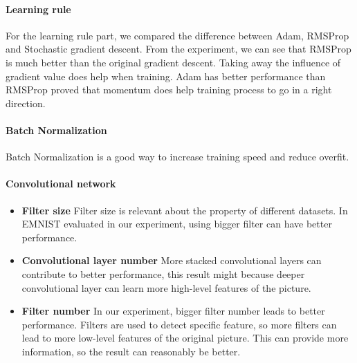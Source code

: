 \documentclass{article}
\begin{document}
\paragraph{Learning rule} For the learning rule part, we compared the difference between Adam, RMSProp and Stochastic gradient descent. From the experiment, we can see that RMSProp is much better than the original gradient descent. Taking away the influence of gradient value does help when training. Adam has better performance than RMSProp  proved that momentum does help training process to go in a right direction.

\paragraph{Batch Normalization} Batch Normalization is a good way to increase training speed and reduce overfit.

\paragraph{Convolutional network}
\begin{itemize}
	\item \textbf{Filter size} Filter size is relevant about the property of different datasets. In EMNIST evaluated in our experiment, using bigger filter can have better performance.
	\item \textbf{Convolutional layer number} More stacked convolutional layers can contribute to better performance, this result might because deeper convolutional layer can learn more high-level features of the picture.
	\item \textbf{Filter number} In our experiment, bigger filter number leads to better performance. Filters are used to detect specific feature, so more filters can lead to more low-level features of the original picture. This can provide more information, so the result can reasonably be better.
\end{itemize}
 




\end{document}
